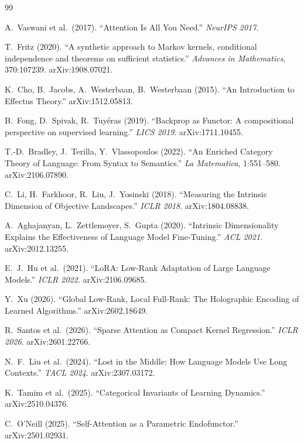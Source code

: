 \documentclass[11pt,a4paper]{ctexart}
\begin{document}
\begin{thebibliography}{99}

A.~Vaswani et al.\ (2017).
``Attention Is All You Need.''
\textit{NeurIPS 2017}.

T.~Fritz (2020).
``A synthetic approach to Markov kernels, conditional independence and theorems on sufficient statistics.''
\textit{Advances in Mathematics}, 370:107239. arXiv:1908.07021.

K.~Cho, B.~Jacobs, A.~Westerbaan, B.~Westerbaan (2015).
``An Introduction to Effectus Theory.''
arXiv:1512.05813.

B.~Fong, D.~Spivak, R.~Tuy\'{e}ras (2019).
``Backprop as Functor: A compositional perspective on supervised learning.''
\textit{LICS 2019}. arXiv:1711.10455.

T.-D.~Bradley, J.~Terilla, Y.~Vlassopoulos (2022).
``An Enriched Category Theory of Language: From Syntax to Semantics.''
\textit{La Matematica}, 1:551--580. arXiv:2106.07890.

C.~Li, H.~Farkhoor, R.~Liu, J.~Yosinski (2018).
``Measuring the Intrinsic Dimension of Objective Landscapes.''
\textit{ICLR 2018}. arXiv:1804.08838.

A.~Aghajanyan, L.~Zettlemoyer, S.~Gupta (2020).
``Intrinsic Dimensionality Explains the Effectiveness of Language Model Fine-Tuning.''
\textit{ACL 2021}. arXiv:2012.13255.

E.~J.~Hu et al.\ (2021).
``LoRA: Low-Rank Adaptation of Large Language Models.''
\textit{ICLR 2022}. arXiv:2106.09685.

Y.~Xu (2026).
``Global Low-Rank, Local Full-Rank: The Holographic Encoding of Learned Algorithms.''
arXiv:2602.18649.

R.~Santos et al.\ (2026).
``Sparse Attention as Compact Kernel Regression.''
\textit{ICLR 2026}. arXiv:2601.22766.

N.~F.~Liu et al.\ (2024).
``Lost in the Middle: How Language Models Use Long Contexts.''
\textit{TACL 2024}. arXiv:2307.03172.

K.~Tamim et al.\ (2025).
``Categorical Invariants of Learning Dynamics.''
arXiv:2510.04376.

C.~O'Neill (2025).
``Self-Attention as a Parametric Endofunctor.''
arXiv:2501.02931.


\end{thebibliography}
\end{document}
